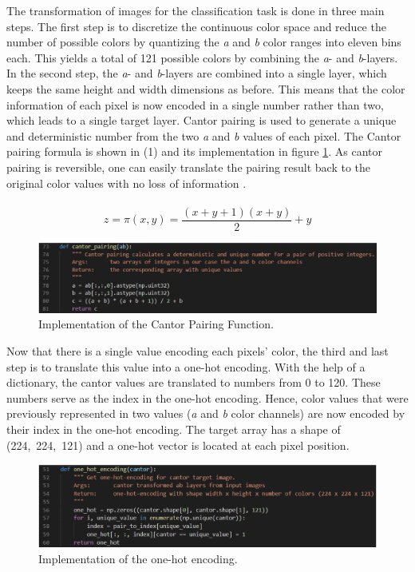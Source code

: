 \documentclass[12pt,letterpaper]{article}
\begin{document}
The transformation of images for the classification task is done in three main steps. The first step is to discretize the continuous color space and reduce the number of possible colors by quantizing the \emph{a} and \emph{b} color ranges into eleven bins each. This yields a total of 121 possible colors by combining the \emph{a}- and \emph{b}-layers. In the second step, the \emph{a}- and \emph{b}-layers are combined into a single layer, which keeps the same height and width dimensions as before. This means that the color information of each pixel is now encoded in a single number rather than two, which leads to a single target layer. Cantor pairing is used to generate a unique and deterministic number from the two \emph{a} and \emph{b} values of each pixel. The Cantor pairing formula is shown in (1) and its implementation in figure \ref{cantorpairing}. As cantor pairing is reversible, one can easily translate the pairing result back to the original color values with no loss of information \citep{cantor2007}.\\\\
\begin{equation}
z = \pi(x,y) = \frac{(x+y+1)(x+y)}{2}+y
\end{equation}
\newpage
\begin{figure}[h]
	\centering
	\includegraphics[width=1.0\textwidth]{code_cantor_pairing.png}
	\caption{Implementation of the Cantor Pairing Function.}
	\label{cantorpairing}
\end{figure}
Now that there is a single value encoding each pixels’ color, the third and last step is to translate this value into a one-hot encoding. With the help of a dictionary, the cantor values are translated to numbers from 0 to 120. These numbers serve as the index in the one-hot encoding. Hence, color values that were previously represented in two values (\emph{a} and \emph{b} color channels) are now encoded by their index in the one-hot encoding. The target array has a shape of \mbox{(224, 224, 121)} and a one-hot vector is located at each pixel position.\\
\begin{figure}[htb]
	\centering
	\includegraphics[width=1.0\textwidth]{code_onehot.png}
	\caption{Implementation of the one-hot encoding.}
	\label{onehot}
\end{figure}
\end{document}
